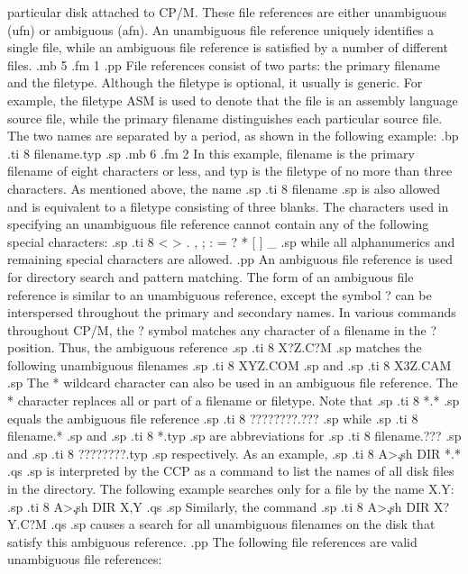particular disk attached to CP/M.  These file references are
either unambiguous (ufn) or ambiguous (afn).  An unambiguous file
reference uniquely identifies a single file, while an ambiguous file
reference is satisfied by a number of different files.
.mb 5
.fm 1
.pp
File references consist of two parts:  the primary filename and the
filetype.  Although the filetype is optional, it usually is 
generic.  For example, the filetype ASM is used to denote that the file is an
assembly language source file, while the primary filename distinguishes each
particular source file.  The two names are separated by a period, as shown
in the following example:
.bp
.ti 8
filename.typ
.sp
.mb 6
.fm 2
In this example, filename is the primary filename of eight characters or
less, and typ
is the filetype of no more than three characters.  As mentioned above, the
name
.sp
.ti 8
filename
.sp
is also allowed and is equivalent to a filetype consisting of 
three blanks.  The characters used in specifying an unambiguous 
file reference cannot contain any of the following special 
characters:
.sp
.ti 8
< > . , ; : = ? * [ ] _ %
.sp
while all alphanumerics and remaining special characters are allowed.
.pp
An ambiguous file reference is used for directory search and pattern
matching.  The form of an ambiguous file reference is similar to an
unambiguous reference, except the symbol ? can be interspersed throughout
the primary and secondary names.  In various commands throughout CP/M,
the ? symbol matches any character of a filename in the ? position.
Thus, the ambiguous reference
.sp
.ti 8
X?Z.C?M
.sp
matches the following unambiguous filenames
.sp
.ti 8
XYZ.COM
.sp
and
.sp
.ti 8
X3Z.CAM
.sp
The * wildcard character can also be used in an ambiguous file 
reference.  The * character replaces all or part of a filename or 
filetype.  Note that
.sp
.ti 8
*.*
.sp
equals the ambiguous file reference
.sp
.ti 8
????????.???
.sp
while
.sp
.ti 8
filename.*
.sp
and
.sp
.ti 8
*.typ
.sp
are abbreviations for
.sp
.ti 8
filename.???
.sp
and
.sp
.ti 8
????????.typ
.sp
respectively.  As an example,
.sp
.ti 8
A>\c
.sh
DIR *.*
.qs
.sp
is interpreted by the CCP as a command to list the names of all disk files
in the directory.  The following example searches only for a file 
by the name X.Y:
.sp
.ti 8
A>\c
.sh
DIR X,Y
.qs
.sp
Similarly, the command
.sp
.ti 8
A>\c
.sh
DIR X?Y.C?M
.qs
.sp
causes a search for all unambiguous filenames on the disk that satisfy
this ambiguous reference.
.pp
The following file references are valid unambiguous file references:
